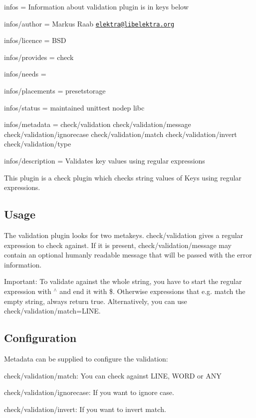 
\begin{DoxyItemize}
\item infos = Information about validation plugin is in keys below
\item infos/author = Markus Raab \href{mailto:elektra@libelektra.org}{\tt elektra@libelektra.\+org}
\item infos/licence = B\+SD
\item infos/provides = check
\item infos/needs =
\item infos/placements = presetstorage
\item infos/status = maintained unittest nodep libc
\item infos/metadata = check/validation check/validation/message check/validation/ignorecase check/validation/match check/validation/invert check/validation/type
\item infos/description = Validates key values using regular expressions
\end{DoxyItemize}

This plugin is a check plugin which checks string values of Keys using regular expressions.

\subsection*{Usage}

The validation plugin looks for two metakeys. {\ttfamily check/validation} gives a regular expression to check against. If it is present, {\ttfamily check/validation/message} may contain an optional humanly readable message that will be passed with the error information.

Important\+: To validate against the whole string, you have to start the regular expression with {\ttfamily $^\wedge$} and end it with {\ttfamily \$}. Otherwise expressions that e.\+g. match the empty string, always return true. Alternatively, you can use {\ttfamily check/validation/match=L\+I\+NE}.

\subsection*{Configuration}

Metadata can be supplied to configure the validation\+:


\begin{DoxyItemize}
\item {\ttfamily check/validation/match}\+: You can check against {\ttfamily L\+I\+NE}, {\ttfamily W\+O\+RD} or {\ttfamily A\+NY}
\item {\ttfamily check/validation/ignorecase}\+: If you want to ignore case.
\item {\ttfamily check/validation/invert}\+: If you want to invert match.
\end{DoxyItemize}

